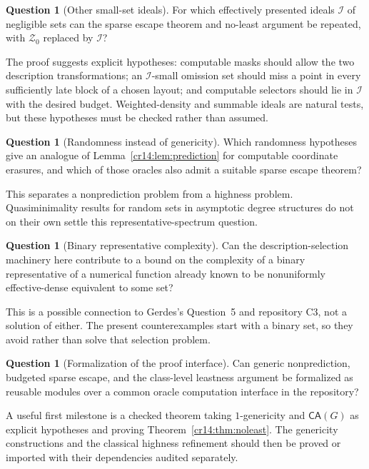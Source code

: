 \documentclass[11pt,a4paper]{article}
\newcommand{\CA}{\mathsf{CA}}
\theoremstyle{definition}
\newtheorem{question}[theorem]{Question}
\theoremstyle{remark}
\begin{document}
\begin{question}[Other small-set ideals]\label{cr14:q:ideals}
For which effectively presented ideals $\mathcal I$ of negligible sets
can the sparse escape theorem and no-least argument be repeated, with
$\mathcal Z_0$ replaced by $\mathcal I$?
\end{question}
The proof suggests explicit hypotheses: computable masks should allow the
two description transformations; an $\mathcal I$-small omission set should
miss a point in every sufficiently late block of a chosen layout; and
computable selectors should lie in $\mathcal I$ with the desired budget.
Weighted-density and summable ideals are natural tests, but these hypotheses
must be checked rather than assumed.

\begin{question}[Randomness instead of genericity]\label{cr14:q:random}
Which randomness hypotheses give an analogue of
Lemma~\ref{cr14:lem:prediction} for computable coordinate erasures, and which
of those oracles also admit a suitable sparse escape theorem?
\end{question}
This separates a nonprediction problem from a highness problem.
Quasiminimality results for random sets in asymptotic degree structures do
not on their own settle this representative-spectrum question.\cite{AHJ}

\begin{question}[Binary representative complexity]\label{cr14:q:binary}
Can the description-selection machinery here contribute to a bound on the
complexity of a binary representative of a numerical function already
known to be nonuniformly effective-dense equivalent to some set?
\end{question}
This is a possible connection to Gerdes's Question~5 and repository C3,
not a solution of either. The present counterexamples start with a binary
set, so they avoid rather than solve that selection problem.\cite{Gerdes,ProveIt}

\begin{question}[Formalization of the proof interface]\label{cr14:q:lean}
Can generic nonprediction, budgeted sparse escape, and the class-level
leastness argument be formalized as reusable modules over a common oracle
computation interface in the repository?
\end{question}
A useful first milestone is a checked theorem taking $1$-genericity and
$\CA(G)$ as explicit hypotheses and proving Theorem~\ref{cr14:thm:noleast}.
The genericity constructions and the classical highness refinement should
then be proved or imported with their dependencies audited separately.
\end{document}
